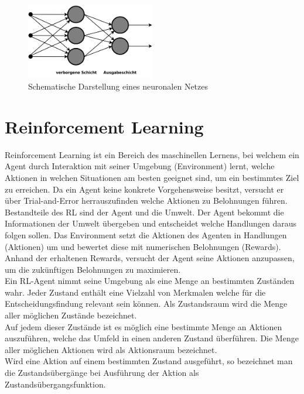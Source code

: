 \begin{figure}[!htb]
	\centering
	\includegraphics[width=0.5\textwidth]{Bilder/AufbauNN.png}
	\caption{Schematische Darstellung eines neuronalen Netzes \cite{noauthor_kunstliche_nodate}}
    \label{fig:neuronalesNetz}
\end{figure}



\clearpage
\section{Reinforcement Learning}
Reinforcement Learning ist ein Bereich des maschinellen Lernens, bei welchem ein Agent durch Interaktion mit seiner Umgebung (Environment) lernt, welche Aktionen in welchen Situationen am besten geeignet sind, um ein bestimmtes Ziel zu erreichen. Da ein Agent keine konkrete Vorgehensweise besitzt, versucht er über Trial-and-Error herrauszufinden welche Aktionen zu Belohnungen führen. \\
Bestandteile des RL sind der Agent und die Umwelt. Der Agent bekommt die Informationen der Umwelt übergeben und entscheidet welche Handlungen daraus folgen sollen. Das Environment setzt die Aktionen des Agenten in Handlungen (Aktionen) um und bewertet diese mit numerischen Belohnungen (Rewards). Anhand der erhaltenen Rewards, versucht der Agent seine Aktionen anzupassen, um die zukünftigen Belohnungen zu maximieren. \\
Ein RL-Agent nimmt seine Umgebung als eine Menge an bestimmten Zuständen wahr.
Jeder Zustand enthält eine Vielzahl von Merkmalen welche für die Entscheidungsfindung relevant sein können.
Als Zustandsraum wird die Menge aller möglichen Zustände bezeichnet.\\
Auf jedem dieser Zustände ist es möglich eine bestimmte Menge an Aktionen auszuführen, welche das Umfeld in einen anderen Zustand überführen.
Die Menge aller möglichen Aktionen wird als Aktionsraum bezeichnet.\\
Wird eine Aktion auf einem bestimmten Zustand ausgeführt, so bezeichnet man die Zustandsübergänge bei Ausführung der Aktion als Zustandsübergangsfunktion.\\

